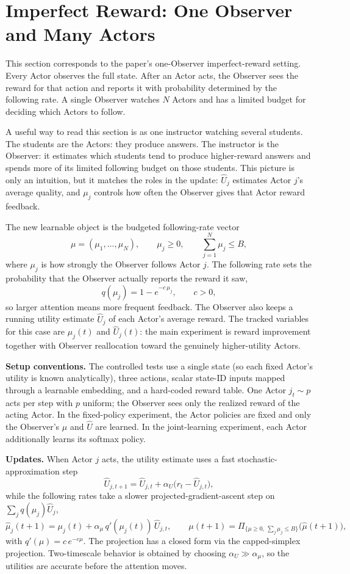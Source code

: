 \documentclass[11pt]{article}
\newcommand{\reportprob}{q}
\begin{document}
\section{Imperfect Reward: One Observer and Many Actors}

This section corresponds to the paper's one-Observer imperfect-reward setting.
Every Actor observes the full state. After an Actor acts, the Observer sees the
reward for that action and reports it with probability determined by the
following rate. A single Observer watches \(N\) Actors and has a limited budget
for deciding which Actors to follow.

A useful way to read this section is as one instructor watching several
students. The students are the Actors: they produce answers. The instructor is
the Observer: it estimates which students tend to produce higher-reward
answers and spends more of its limited following budget on those students.
This picture is only an intuition, but it matches the roles in the update:
\(\hat U_j\) estimates Actor \(j\)'s average quality, and \(\mu_j\)
controls how often the Observer gives that Actor reward feedback.

The new learnable object is the budgeted following-rate vector
\[
  \mu = (\mu_1,\dots,\mu_N),\qquad \mu_j \ge 0,\qquad \sum_{j=1}^{N}\mu_j \le B,
\]
where \(\mu_j\) is how strongly the Observer follows Actor \(j\). The following
rate sets the probability that the Observer actually reports the reward it saw,
\[
  \reportprob(\mu_j) = 1 - e^{-c\,\mu_j},\qquad c>0,
\]
so larger attention means more frequent feedback. The Observer also keeps a
running utility estimate \(\hat U_j\) of each Actor's average reward. The
tracked variables for this case are \(\mu_j(t)\) and \(\hat U_j(t)\): the main
experiment is reward improvement together with Observer reallocation toward the
genuinely higher-utility Actors.

\textbf{Setup conventions.} The controlled tests use a single state (so each
fixed Actor's utility is known analytically), three actions, scalar state-ID
inputs mapped through a learnable embedding, and a hard-coded reward table.
One Actor \(j_t\sim p\) acts per step with \(p\) uniform; the Observer sees
only the realized reward of the acting Actor. In the fixed-policy experiment,
the Actor policies are fixed and only the Observer's \(\mu\) and \(\hat U\)
are learned. In the joint-learning experiment, each Actor additionally learns
its softmax policy.

\textbf{Updates.} When Actor \(j\) acts, the utility estimate uses a fast
stochastic-approximation step
\[
  \hat U_{j,t+1} = \hat U_{j,t} + \alpha_U\bigl(r_t - \hat U_{j,t}\bigr),
\]
while the following rates take a slower projected-gradient-ascent step on
\(\sum_j \reportprob(\mu_j)\hat U_j\),
\[
  \hat\mu_{j}(t+1) = \mu_j(t) + \alpha_\mu\,\reportprob'(\mu_j(t))\,\hat U_{j,t},
  \qquad
  \mu(t+1) = \Pi_{\{\mu\ge 0,\ \sum_j\mu_j\le B\}}\bigl(\hat\mu(t+1)\bigr),
\]
with \(\reportprob'(\mu)=c\,e^{-c\mu}\). The projection has a closed form via the
capped-simplex projection. Two-timescale behavior is obtained by choosing
\(\alpha_U \gg \alpha_\mu\), so the utilities are accurate before the attention
moves.
\end{document}
